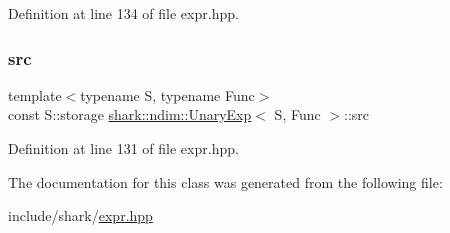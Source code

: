 Definition at line 134 of file expr.\+hpp.

\hypertarget{classshark_1_1ndim_1_1_unary_exp_ad43011a53ffbee999334c7cc52fb95ad}{}\label{classshark_1_1ndim_1_1_unary_exp_ad43011a53ffbee999334c7cc52fb95ad} 
\subsubsection{\texorpdfstring{src}{src}}
{\footnotesize\ttfamily template$<$typename S, typename Func$>$ \\
const S\+::storage \hyperlink{classshark_1_1ndim_1_1_unary_exp}{shark\+::ndim\+::\+Unary\+Exp}$<$ S, Func $>$\+::src\hspace{0.3cm}{\ttfamily [private]}}



Definition at line 131 of file expr.\+hpp.



The documentation for this class was generated from the following file\+:\begin{DoxyCompactItemize}
\item 
include/shark/\hyperlink{expr_8hpp}{expr.\+hpp}\end{DoxyCompactItemize}

